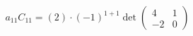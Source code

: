 \documentclass[preview]{standalone}
\begin{document}
\begin{align*}
a_{11}C_{11} = (2) \cdot (-1)^{1+1} \det\begin{pmatrix} 4 & 1 \\ -2 & 0 \end{pmatrix}
\end{align*}
\end{document}
